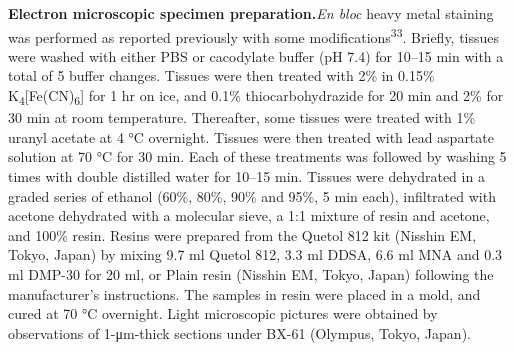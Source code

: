 \documentclass{article}
\begin{document}
\noindent\textbf{Electron microscopic specimen preparation.}\quad \emph{En bloc} heavy metal staining was performed as reported previously with some modifications\textsuperscript{33}. Briefly, tissues were washed with either PBS or cacodylate buffer (pH 7.4) for 10–15 min with a total of 5 buffer changes. Tissues were then treated with 2\%  in 0.15\% K\textsubscript{4}[Fe(CN)\textsubscript{6}] for 1 hr on ice, and 0.1\% thiocarbohydrazide for 20 min and 2\%  for 30 min at room temperature. Thereafter, some tissues were treated with 1\% uranyl acetate at 4 °C overnight. Tissues were then treated with lead aspartate solution at 70 °C for 30 min. Each of these treatments was followed by washing 5 times with double distilled water for 10–15 min. Tissues were dehydrated in a graded series of ethanol (60\%, 80\%, 90\% and 95\%, 5 min each), infiltrated with acetone dehydrated with a molecular sieve, a 1:1 mixture of resin and acetone, and 100\% resin. Resins were prepared from the Quetol 812 kit (Nisshin EM, Tokyo, Japan) by mixing 9.7 ml Quetol 812, 3.3 ml DDSA, 6.6 ml MNA and 0.3 ml DMP-30 for 20 ml, or Plain resin (Nisshin EM, Tokyo, Japan) following the manufacturer’s instructions. The samples in resin were placed in a mold, and cured at 70 °C overnight. Light microscopic pictures were obtained by observations of 1-μm-thick sections under BX-61 (Olympus, Tokyo, Japan).
\end{document}
